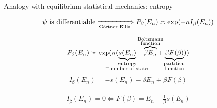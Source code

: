 \documentclass{beamer}
\begin{document}
\begin{frame}{Analogy with equilibrium statistical mechanics: entropy}

\begin{align*}
\psi \text{ is differentiable}\xRightarrow[\text{Gärtner-Ellis}]{} P_{\beta}(E_n) \asymp \exp(-n I_{\beta}(E_n))
\end{align*}

\return
\begin{align*}
P_{\beta}(E_n) \asymp \exp(n(\underbrace{s(E_n)}_{\mathclap{\substack{\text{entropy}\\\equiv\text{number of states}}}} - \overbrace{\beta E_n}^{\mathclap{\substack{\text{Boltzmann}\\\text{function}}}} + \underbrace{\beta F(\beta)}_{\mathclap{\substack{\text{partition}\\\text{function}}}}))
\end{align*}
\begin{align*}
I_{\beta}(E_n) = -s(E_n) - \beta E_n + \beta F(\beta)
\end{align*}

\return
\begin{align*}
I_{\beta}(E_n) = 0 \Leftrightarrow F(\beta) = E_n - \frac{1}{\beta} s(E_n)
\end{align*}

\end{frame}
\end{document}
